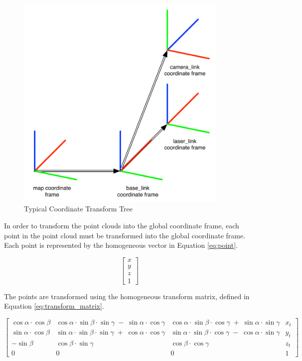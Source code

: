 \documentclass[12pt]{report}
\begin{document}
\begin{figure}[ht]
  \centering
  \includegraphics[width=4in,keepaspectratio]{transforms.pdf}
  \caption{Typical Coordinate Transform Tree}
  \label{fig:transforms}
\end{figure}

In order to transform the point clouds into the global coordinate frame, each point in the point cloud must be transformed into the global coordinate frame.  Each point is represented by the homogeneous vector in Equation \ref{eq:point}.

\begin{equation} \label{eq:point}
\left[ \begin{array}{c} x \\ y \\ z \\ 1 \end{array} \right]
\end{equation}

The points are transformed using the homogeneous transform matrix\cite{lavalle2006planning}, defined in Equation \ref{eq:transform_matrix}.

\begin{equation} \label{eq:transform_matrix}
\left[ \begin{array}{cccc} \cos \alpha \cdot \cos \beta  & \cos \alpha \cdot \sin \beta \cdot \sin \gamma \; -\; \sin \alpha \cdot \cos \gamma  & \cos \alpha \cdot \sin \beta \cdot \cos \gamma \; +\; \sin \alpha \cdot \sin \gamma  & x_{t} \\ \sin \alpha \cdot \cos \beta  & \sin \alpha \cdot \sin \beta \cdot \sin \gamma \; +\; \cos \alpha \cdot \cos \gamma  & \sin \alpha \cdot \sin \beta \cdot \cos \gamma \; -\; \cos \alpha \cdot \sin \gamma  & y_{t} \\ -\sin \beta  & \cos \beta \cdot \sin \gamma  & \cos \beta \cdot \cos \gamma & z_{t} \\ 0 & 0 & 0 & 1 \end{array} \right]
\end{equation}
\end{document}
